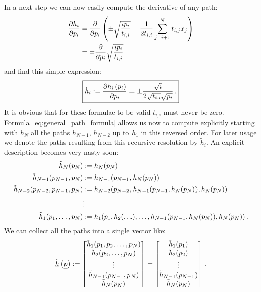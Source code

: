 \documentclass[a4paper,10pt]{article}
\begin{document}
In a next step we can now easily compute the derivative of any path:
\begin{equation}
\begin{split}
  \frac{\partial h_i}{\partial p_i}
  & = \frac{\partial }{\partial p_i}
      \left(\pm \sqrt{\frac{\imath p_i}{t_{i,i}}} -\frac{1}{2 t_{i,i}} \sum_{j=i+1}^{N} t_{i,j} x_j\right) \\
  & = \pm \frac{\partial }{\partial p_i} \sqrt{\frac{\imath p_i}{t_{i,i}}}
\end{split}
\end{equation}
and find this simple expression:
\begin{equation}\label{eq:general_path_derivative_formula}
\boxed{
  \dot{h}_i := \frac{\partial h_i\left(p_i\right)}{\partial p_i}
  = \pm \frac{\sqrt{\imath}}{2 \sqrt{t_{i,i}}\sqrt{p_i}} \,.
}
\end{equation}
It is obvious that for these formulae to be valid
$t_{i,i}$ must never be zero.
Formula~\eqref{eq:general_path_formula} allows us now to compute explicitly
starting with $h_N$ all the paths $h_{N-1}$, $h_{N-2}$ up to $h_1$ in
this reversed order.
For later usage we denote the paths resulting from this
recursive resolution by $\tilde{h}_i$. An explicit description
becomes very nasty soon:
\begin{equation*}
\begin{split}
  \tilde{h}_N(p_N)
  & := h_N(p_N) \\
  \tilde{h}_{N-1}(p_{N-1}, p_N)
  & := h_{N-1}(p_{N-1},
                    h_N(p_N)
                   ) \\
  \tilde{h}_{N-2}(p_{N-2}, p_{N-1}, p_N)
  & := h_{N-2}(p_{N-2},
                    h_{N-1}(p_{N-1},
                      h_N(p_N)
                    ),
                    h_N(p_N)
                   ) \\
  & \vdots \\
  \tilde{h}_1(p_1, \ldots, p_N)
  & := h_1(p_1,
                h_2(\ldots),
                \ldots,
                h_{N-1}(p_{N-1}, h_N(p_N)),
                h_N(p_N)
               ) \,.
\end{split}
\end{equation*}
We can collect all the paths into a single vector like:
\begin{equation}
 \underline{\tilde{h}}\left(\underline{p}\right) :=
 \begin{bmatrix}
  \tilde{h}_1(p_1, p_2, \ldots, p_N) \\
  \tilde{h}_2(p_2, \ldots, p_N) \\
  \vdots \\
  \tilde{h}_{N-1}(p_{N-1}, p_N) \\
  \tilde{h}_{N}(p_N) \\
 \end{bmatrix}
 =
 \begin{bmatrix}
  \tilde{h}_1(p_1) \\
  \tilde{h}_2(p_2) \\
  \vdots \\
  \tilde{h}_{N-1}(p_{N-1}) \\
  \tilde{h}_{N}(p_N) \\
 \end{bmatrix} \,.
\end{equation}
\end{document}
